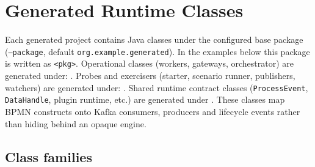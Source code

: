 \section{Generated Runtime Classes}
\label{sec:GeneratedRuntime}

Each generated project contains Java classes under the configured base package
(\texttt{--package}, default \texttt{org.example.generated}). In the examples
below this package is written as \texttt{<pkg>}.
Operational classes (workers, gateways, orchestrator) are generated under:
.
Probes and exercisers (starter, scenario runner, publishers, watchers) are
generated under:
.
Shared runtime contract classes (\texttt{ProcessEvent}, \texttt{DataHandle},
plugin runtime, etc.) are generated under
.
These classes map BPMN constructs onto Kafka consumers, producers and lifecycle events
rather than hiding behind an opaque engine.

\subsection{Class families}


